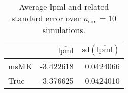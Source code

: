 \begin{table}[H]

\caption{Average lpml and related standard error over $n_{\text{sim}} = 10$ simulations.}
\centering
\begin{tabular}[t]{lrr}
\toprule
  & $\overbar{\text{lpml}}$ & $\text{sd}(\overbar{\text{lpml}})$\\
\midrule
msMK & -3.422618 & 0.0424066\\
True & -3.376625 & 0.0424010\\
\bottomrule
\end{tabular}
\end{table}